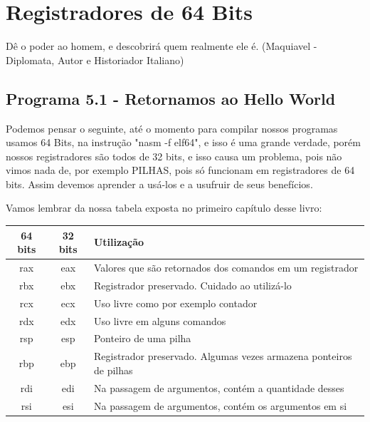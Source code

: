\chapter{Registradores de 64 Bits}

\begin{remark}
	Dê o poder ao homem, e descobrirá quem realmente ele é. (Maquiavel - Diplomata, Autor e Historiador Italiano) 
\end{remark}

\section{Programa 5.1 - Retornamos ao Hello World}
Podemos pensar o seguinte, até o momento para compilar nossos programas usamos 64 Bits, na instrução "nasm -f elf64", e isso é uma grande verdade, porém nossos registradores são todos de 32 bits, e isso causa um problema, pois não vimos nada de, por exemplo PILHAS, pois só funcionam em registradores de 64 bits. Assim devemos aprender a usá-los e a usufruir de seus benefícios.

Vamos lembrar da nossa tabela exposta no primeiro capítulo desse livro:
\begin{table}[H]
	\centering 
	\begin{tabular}{c | c | l }
		\textbf{64 bits} & \textbf{32 bits} & \textbf{Utilização} \\ \hline
		rax & eax & Valores que são retornados dos comandos em um registrador \\
		rbx & ebx & Registrador preservado. Cuidado ao utilizá-lo \\
		rcx & ecx & Uso livre como por exemplo contador \\
		rdx & edx & Uso livre em alguns comandos \\
		rsp & esp & Ponteiro de uma pilha \\
		rbp & ebp & Registrador preservado. Algumas vezes armazena ponteiros de pilhas \\
		rdi & edi & Na passagem de argumentos, contém a quantidade desses \\
		rsi & esi & Na passagem de argumentos, contém os argumentos em si \\
	\end{tabular}
\end{table}

